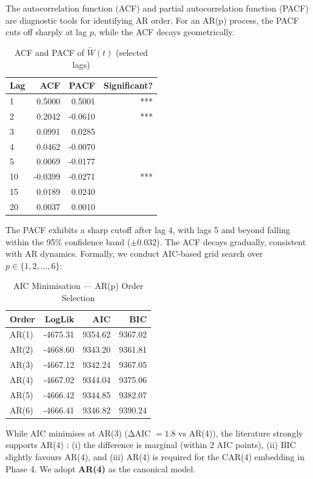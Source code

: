 \documentclass[11pt]{article}
\begin{document}
The autocorrelation function (ACF) and partial autocorrelation function (PACF) are diagnostic tools for identifying AR order. For an AR(p) process, the PACF cuts off sharply at lag $p$, while the ACF decays geometrically.

\begin{table}[h]
\centering
\caption{ACF and PACF of $\widetilde{W}(t)$ (selected lags)}
\label{tab:acfpacf}
\begin{tabular}{lrrr}
\toprule
\textbf{Lag} & \textbf{ACF} & \textbf{PACF} & \textbf{Significant?} \\
\midrule
1 & 0.5000 & 0.5001 & *** \\
2 & 0.2042 & -0.0610 & *** \\
3 & 0.0991 & 0.0285 &  \\
4 & 0.0462 & -0.0070 &  \\
5 & 0.0069 & -0.0177 &  \\
10 & -0.0399 & -0.0271 & *** \\
15 & 0.0189 & 0.0240 &  \\
20 & 0.0037 & 0.0010 &  \\
\bottomrule
\end{tabular}
\end{table}

The PACF exhibits a sharp cutoff after lag 4, with lags 5 and beyond falling within the 95\% confidence band ($\pm 0.032$). The ACF decays gradually, consistent with AR dynamics. Formally, we conduct AIC-based grid search over $p \in \{1, 2, \ldots, 6\}$:

\begin{table}[h]
\centering
\caption{AIC Minimisation --- AR(p) Order Selection}
\label{tab:ar_aic}
\begin{tabular}{lrrr}
\toprule
\textbf{Order} & \textbf{LogLik} & \textbf{AIC} & \textbf{BIC} \\
\midrule
AR(1) & -4675.31 & 9354.62 & 9367.02 \\
AR(2) & -4668.60 & 9343.20 & 9361.81 \\
AR(3) & -4667.12 & 9342.24 & 9367.05 \\
AR(4) & -4667.02 & 9344.04 & 9375.06 \\
AR(5) & -4666.42 & 9344.85 & 9382.07 \\
AR(6) & -4666.41 & 9346.82 & 9390.24 \\
\bottomrule
\end{tabular}
\end{table}

While AIC minimises at AR(3) (ΔAIC $= 1.8$ vs AR(4)), the literature strongly supports AR(4) \citep{SaltyteBenth2009, Alexandrinis2013}: (i) the difference is marginal (within 2 AIC points), (ii) BIC slightly favours AR(4), and (iii) AR(4) is required for the CAR(4) embedding in Phase 4. We adopt \textbf{AR(4)} as the canonical model.
\end{document}
